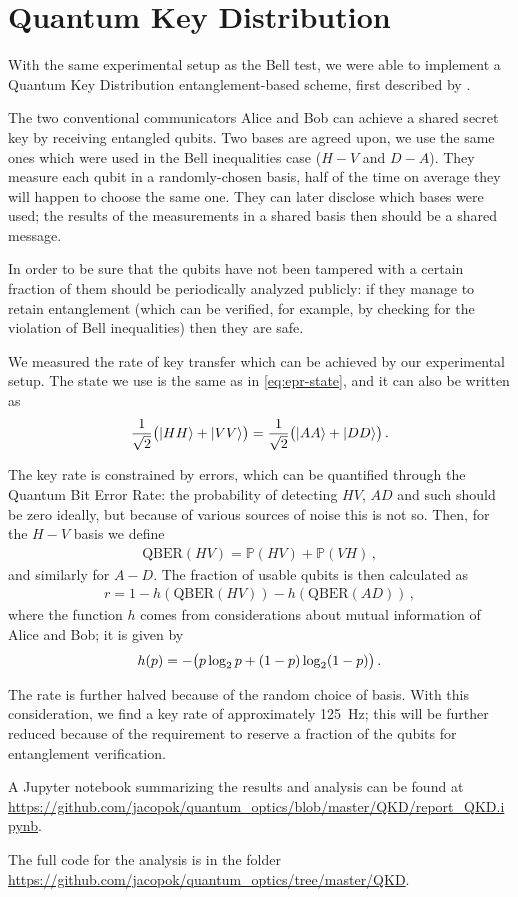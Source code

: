 \documentclass[main.tex]{subfiles}
\begin{document}
\section{Quantum Key Distribution}

With the same experimental setup as the Bell test, we were able to implement a Quantum Key Distribution entanglement-based scheme, first described by \textcite{bennettQuantumCryptographyBell1992}. 

The two conventional communicators Alice and Bob can achieve a shared secret key by receiving entangled qubits. 
Two bases are agreed upon, we use the same ones which were used in the Bell inequalities case (\(H-V\) and \(D-A\)).
They measure each qubit in a randomly-chosen basis, half of the time on average they will happen to choose the same one.
They can later disclose which bases were used; the results of the measurements in a shared basis then should be a shared message. 

In order to be sure that the qubits have not been tampered with a certain fraction of them should be periodically analyzed publicly: if they manage to retain entanglement (which can be verified, for example, by checking for the violation of Bell inequalities) then they are safe. 

We measured the rate of key transfer which can be achieved by our experimental setup. 
The state we use is the same as in \eqref{eq:epr-state}, and it can also be written as 
%
\begin{align}
\frac{1}{\sqrt{2}} \qty(\ket{HH} + \ket{VV})
=
\frac{1}{\sqrt{2}} \qty(\ket{AA} + \ket{DD})
\,.
\end{align}

The key rate is constrained by errors, which can be quantified through the Quantum Bit Error Rate: the probability of detecting \(HV\), \(AD\) and such should be zero ideally, but because of various sources of noise this is not so.
Then, for the \(H-V\) basis we define 
%
\begin{align}
\text{QBER}(HV) = \mathbb{P}(HV)+ \mathbb{P}(VH)
\,,
\end{align}
%
and similarly for \(A-D\). 
The fraction of usable qubits is then calculated as 
%
\begin{align}
r = 
1
- h (\text{QBER}(HV))
- h (\text{QBER}(AD))
\,,
\end{align}
%
where the function \(h\) comes from considerations about mutual information of Alice and Bob; it is given by 
%
\begin{align}
h (p) = - \qty(p \log_2 p + (1-p) \log_2 (1-p) )
\,.
\end{align}

The rate is further halved because of the random choice of basis. With this consideration, we find a key rate of approximately \SI{125}{Hz}; this will be further reduced because of the requirement to reserve a fraction of the qubits for entanglement verification.

A Jupyter notebook summarizing the results and analysis can be found at \url{https://github.com/jacopok/quantum_optics/blob/master/QKD/report_QKD.ipynb}.

The full code for the analysis is in the folder \url{https://github.com/jacopok/quantum_optics/tree/master/QKD}.
\end{document}

